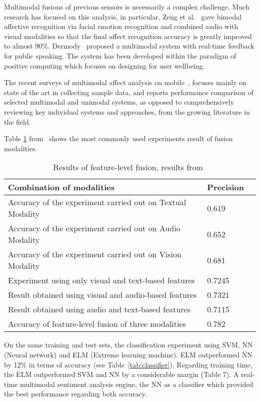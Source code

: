 Multimodal fusions of previous sensors is necessarily a complex challenge. Much research has focused on this analysis, in particular, Zeng et al.~\cite{Zeng2004} gave bimodal affective recognition via facial emotion recognition and combined audio with visual modalities so that the final affect recognition accuracy is greatly improved to almost 90\%. Dermody~\cite{Dermody2016} proposed a multimodal system with real-time feedback for public speaking. The system has been developed within the paradigm of positive computing which focuses on designing for user wellbeing.

The recent surveys of multimodal affect analysis on mobile~\cite{d2015review, poria2016fusing, Poria2017}, focuses mainly on state of the art in collecting sample data, and reports performance comparison of selected multimodal and unimodal systems, as opposed to comprehensively reviewing key individual systems and approaches, from the growing literature in the field.

Table \ref{tab:feature-level} from~\cite{d2015review} shows the most commonly used experiments result of fusion modalities.

\begin{table}
  \tiny
  \caption{Results of feature-level fusion, results from~\cite{d2015review}}
  \label{tab:feature-level}
  \scriptsize
  \begin{center}
    \begin{tabular}{lll}
      Combination of modalities & Precision  \\
    \hline
    Accuracy of the experiment carried out on Textual Modality & 0.619   \\
    Accuracy of the experiment carried out on Audio Modality   & 0.652  \\
    Accuracy of the experiment carried out on Vision Modality   & 0.681  \\
    Experiment using only visual and text-based features       & 0.7245 \\
    Result obtained using visual and audio-based features      & 0.7321 \\
    Result obtained using audio and text-based features        & 0.7115 \\
    Accuracy of feature-level fusion of three modalities       & 0.782 
    \end{tabular}
  \end{center}
\end{table}

On the same training and test sets, the classification
experiment using SVM, NN (Neural network) and ELM (Extreme learning machine). ELM outperformed NN by 12\% in terms of accuracy (see Table~\ref{tab:classifier}).
Regarding training time, the ELM outperformed SVM and NN
by a considerable margin (Table 7). A real-time multimodal sentiment analysis engine, 
the NN as a classifier which provided the best performance regarding both accuracy.


